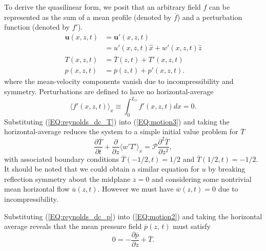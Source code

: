 \documentclass[reprint,amsmath,amssymb,aps,nofootinbib]{revtex4-1}
\renewcommand{\vec}[1]{\boldsymbol{#1}}
\newcommand{\eq}[1]{(\ref{#1})}
\begin{document}
To derive the quasilinear form, we posit that an arbitrary field $f$ can be represented as the sum of a mean profile (denoted by $\overline{f}$) and a perturbation function (denoted by $f'$).
\begin{align}
    \vec{u}(x, z, t) &= \vec{u'}(x, z, t) \label{EQ:reynolds_dc_u}\\
    &= u'(x, z, t)\hat{x} + w'(x, z, t)\hat{z} \\
    T(x, z, t) &= \overline{T}(z, t) + T'(x, z, t) \label{EQ:reynolds_dc_T}\\
    p(x, z, t) &= \overline{p}(z, t) +  p'(x, z, t) \label{EQ:reynolds_dc_p}.
\end{align}
where the mean-velocity components vanish due to incompressibility and symmetry. Perturbations are defined to have no horizontal-average
\begin{equation}
    \langle f'(x, z, t) \rangle_x \equiv \int_{0}^{L_x} f'(x, z, t) dx = 0.
\end{equation}
Substituting \eq{EQ:reynolds_dc_T} into \eq{EQ:motion3} and taking the horizontal-average reduces the system to a simple initial value problem for $\overline{T}$
\begin{equation}
  \frac{\partial \overline{T}}{\partial t} + \frac{\partial}{\partial z} \langle w'T' \rangle_x = \mathcal{P} \frac{\partial^2 \overline{T}}{\partial z^2}, \label{EQ:T0_IVP}
\end{equation}
with associated boundary conditions $\overline{T}(-1/2, t) = 1/2$ and $\overline{T}(1/2, t) = -1/2$. It should be noted that we could obtain a similar equation for $u$ by breaking reflection symmetry about the midplane $z = 0$ and considering some nontrivial mean horizontal flow $\overline{u}(z, t)$. However we must have $\overline{w}(z, t) = 0$ due to incompressibility.

Substituting \eq{EQ:reynolds_dc_p} into \eq{EQ:motion2} and taking the horizontal average reveals that the mean pressure field $\overline{p}(z, \, t)$ must satisfy
\begin{equation}
    0 = -\frac{\partial \overline{p}}{\partial z} + \overline{T}. \label{EQ:p_bar}
\end{equation}
\end{document}

